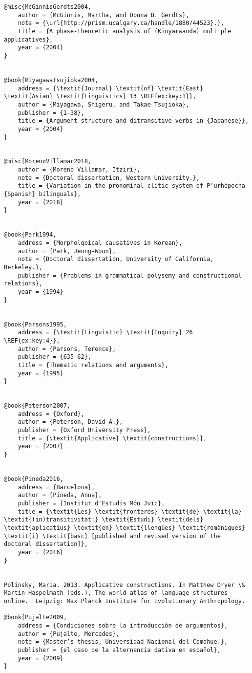 \documentclass[output=paper,modfonts,nonflat]{langsci/langscibook}
\begin{document}
\begin{verbatim}
@misc{McGinnisGerdts2004,
	author = {McGinnis, Martha, and Donna B. Gerdts},
	note = {\url{http://prism.ucalgary.ca/handle/1880/44523}.},
	title = {A phase-theoretic analysis of {Kinyarwanda} multiple applicatives},
	year = {2004}
}


@book{MiyagawaTsujioka2004,
	address = {\textit{Journal} \textit{of} \textit{East} \textit{Asian} \textit{Linguistics} 13 \REF{ex:key:1}},
	author = {Miyagawa, Shigeru, and Takae Tsujioka},
	publisher = {1–38},
	title = {Argument structure and ditransitive verbs in {Japanese}},
	year = {2004}
}


@misc{MorenoVillamar2018,
	author = {Moreno Villamar, Itziri},
	note = {Doctoral dissertation, Western University.},
	title = {Variation in the pronominal clitic system of P'urhépecha-{Spanish} bilinguals},
	year = {2018}
}


@book{Park1994,
	address = {Morpholgoical causatives in Korean},
	author = {Park, Jeong-Woon},
	note = {Doctoral dissertation, University of California, Berkeley.},
	publisher = {Problems in grammatical polysemy and constructional relations},
	year = {1994}
}


@book{Parsons1995,
	address = {\textit{Linguistic} \textit{Inquiry} 26 \REF{ex:key:4}},
	author = {Parsons, Terence},
	publisher = {635–62},
	title = {Thematic relations and arguments},
	year = {1995}
}


@book{Peterson2007,
	address = {Oxford},
	author = {Peterson, David A.},
	publisher = {Oxford University Press},
	title = {\textit{Applicative} \textit{constructions}},
	year = {2007}
}


@book{Pineda2016,
	address = {Barcelona},
	author = {Pineda, Anna},
	publisher = {Institut d'Estudis Món Juïc},
	title = {\textit{Les} \textit{fronteres} \textit{de} \textit{la} \textit{(in)transitivitat:} \textit{Estudi} \textit{dels} \textit{aplicatius} \textit{en} \textit{llengües} \textit{romàniques} \textit{i} \textit{basc} [published and revised version of the doctoral dissertation]},
	year = {2016}
}


Polinsky, Maria. 2013. Applicative constructions. In Matthew Dryer \& Martin Haspelmath (eds.), The world atlas of language structures online.  Leipzig: Max Planck Institute for Evolutionary Anthropology.

@book{Pujalte2009,
	address = {Condiciones sobre la introducción de argumentos},
	author = {Pujalte, Mercedes},
	note = {Master’s thesis, Universidad Nacional del Comahue.},
	publisher = {el caso de la alternancia dativa en español},
	year = {2009}
}



\end{verbatim}
\end{document}
